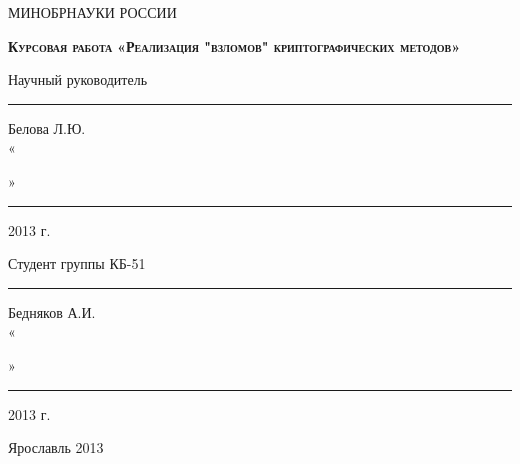 \begin{titlepage}
    \begin{center}
        МИНОБРНАУКИ РОССИИ
        \linebreak

        \vspace{48pt}{
        Федеральное государственное бюджетное образовательное 
        учреждение высшего профессионального образования
        \linebreak
        «Ярославский государственный университет им. П.Г. Демидова»
        }
        \linebreak

        \vspace{1em}{
        Кафедра компьютерной безопасности и
        математических методов обработки информации
        }
    \end{center}

    \vspace{1em}

    \begin{center}
        \textsc{\textbf{Курсовая работа}}
        \linebreak
        \textsc{\textbf{«Реализация "взломов" криптографических методов»}}
    \end{center}

    \vspace{6em}

	\begin{flushright}
        Научный руководитель \\
        \rule{2,2cm}{1pt} Белова Л.Ю. \\
        «\rule{0,5cm}{1pt}» \rule{2,5cm}{1pt} 2013 г.

        \vspace{1.5em}

        Студент группы КБ-51 \\
        \rule{2cm}{1pt} Бедняков А.И. \\
        «\rule{0,5cm}{1pt}» \rule{2,5cm}{1pt} 2013 г.
	\end{flushright}

    \vspace{\fill}

    \begin{center}
        Ярославль 2013
    \end{center}
\end{titlepage}
